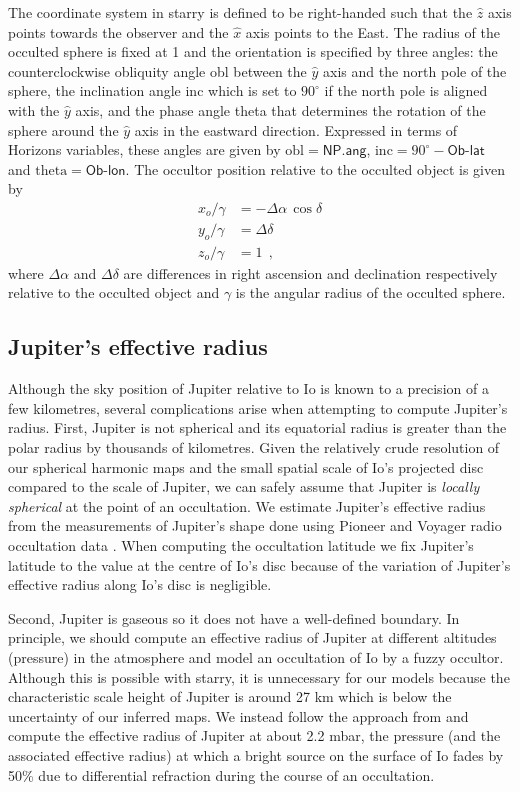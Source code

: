 \documentclass[12pt,dvipsnames]{report}
\newcommand{\hquad}{~~}
\begin{document}
The coordinate system in \textsf{starry} is defined to be right-handed such that the 
$\hat{z}$
axis points towards the observer and the $\hat{x}$ axis points to the East.
The radius of the occulted sphere is fixed at 1 and the orientation is specified by 
three angles:  the counterclockwise obliquity angle \textsf{obl} between the $\hat{y}$
 axis and the north pole of the sphere, the inclination angle \textsf{inc} which is 
 set to $90^\circ$ if the north pole is aligned with the $\hat{y}$ axis, and the 
 phase angle \textsf{theta} that determines the rotation of the sphere around the 
 $\hat{y}$ axis in the eastward direction.
Expressed in terms of Horizons variables, these angles are given by 
$\mathrm{obl}=\textsf{NP.ang}$, $\mathrm{inc}=90^\circ-\textsf{Ob-lat}$ and 
$\mathrm{theta}=\textsf{Ob-lon}$.
The occultor position relative to the occulted object is given by
\begin{align}
    x_o/\gamma&=-\Delta\alpha\,\cos\delta\\
    y_o/\gamma&=\Delta\delta\\
    z_o/\gamma&=1
    \hquad,
\end{align}
where $\Delta\alpha$ and $\Delta\delta$ are differences in right ascension and declination respectively 
relative to the occulted object and $\gamma$ is the angular radius of the occulted sphere.

\subsection{Jupiter's effective radius}
\label{ssec:effective_radius}
Although the sky position of Jupiter relative to Io is known to a precision of a few 
kilometres, several complications arise when attempting to compute Jupiter's radius.
First, Jupiter is not spherical and its equatorial radius is greater than the polar 
radius by thousands of kilometres. 
Given the relatively crude resolution of our spherical harmonic maps and the small
spatial scale of Io's projected disc compared to the scale of Jupiter, we can safely
assume that Jupiter is \emph{locally spherical} at the point of an occultation. 
We estimate Jupiter's effective radius from the measurements of Jupiter's shape 
done using Pioneer and Voyager radio occultation data \citep[Fig.~7 of][]{1981JGR....86.8721L}.
When computing the occultation latitude we fix Jupiter's latitude to the value at the 
centre of Io's disc because of the variation of Jupiter's effective radius along Io's 
disc is negligible.

Second, Jupiter is gaseous so it does not have a well-defined boundary.
In principle, we should compute an effective radius of Jupiter at different altitudes 
(pressure) in the atmosphere and model an occultation of Io by a fuzzy occultor.
Although this is possible with \textsf{starry}, it is unnecessary for our models because 
the characteristic scale height of Jupiter is around 27 km which is below the 
uncertainty of our inferred maps.
We instead follow the approach from \citet{1990Natur.348..618S} and compute the effective 
radius of Jupiter at about 2.2 mbar, the pressure (and the associated effective radius) 
at which a  bright source on the surface of Io fades by 50\% due to differential 
refraction during the course of an occultation.
\end{document}
